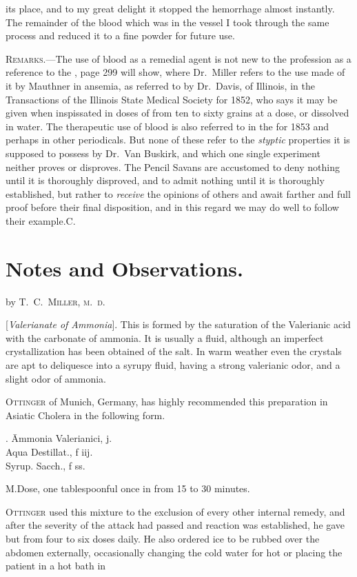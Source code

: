 its place, and to my great delight it stopped the hemorrhage almost
instantly. The remainder of the blood which was in the vessel I took
through the same process and reduced it to a fine powder for future use.

\textsc{Remarks}.---The use of blood as a remedial agent is not new to the
profession as a reference to the , page 299 will show, where
Dr.~Miller refers to the use made of it by Mauthner in ansemia, as
referred to by Dr.~Davis, of Illinois, in the Transactions of the Illinois
State Medical Society for 1852, who says it may be given when inspissated
in doses of from ten to sixty grains at a dose, or dissolved in
water. The therapeutic use of blood is also referred to in the 
for 1853 and perhaps in other periodicals. But none of
these refer to the \emph{styptic} properties it is supposed to possess by Dr.~Van
Buskirk, and which one single experiment neither proves or disproves.
The Pencil Savans are accustomed to deny nothing until it is
thoroughly disproved, and to admit nothing until it is thoroughly established,
but rather to \emph{receive} the opinions of others and await farther
and full proof before their final disposition, and in this regard we may
do well to follow their example.\hfill{}C.\quad

\section*{Notes and Observations.}

by \textsc{T.~C.~Miller, m.~d.}

 [\emph{Valerianate of Ammonia}]. This is formed
by the saturation of the Valerianic acid with the carbonate of ammonia.
It is usually a fluid, although an imperfect crystallization has been obtained
of the salt. In warm weather even the crystals are apt to deliquesce
into a syrupy fluid, having a strong valerianic odor, and a
slight odor of ammonia.

\textsc{Ottinger} of Munich, Germany, has highly recommended this preparation
in Asiatic Cholera in the following form.

\begin{center}
\begin{tabbing}
  \prescription. \= Ammonia Valerianici, \scruple j. \\
    \> Aqua Destillat., f \ounce iij. \\
    \> Syrup. Sacch., f \ounce ss.
\end{tabbing}
\end{center}

M.\quad{}Dose, one tablespoonful once in from 15 to 30 minutes.

\textsc{Ottinger} used this mixture to the exclusion of every other internal
remedy, and after the severity of the attack had passed and reaction
was established, he gave but from four to six doses daily. He also
ordered ice to be rubbed over the abdomen externally, occasionally
changing the cold water for hot or placing the patient in a hot bath in\endinput
